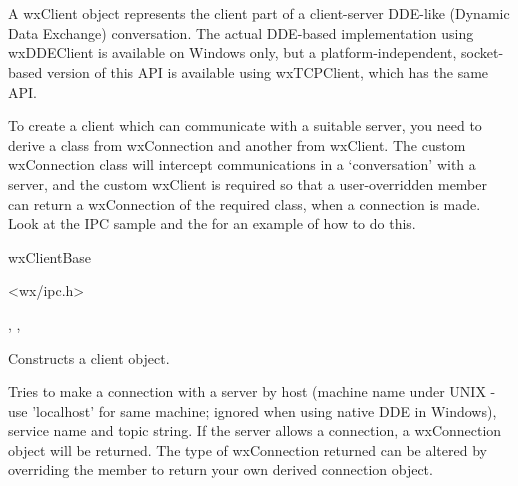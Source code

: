 \section{}\label{wxclient}

A wxClient object represents the client part of a client-server
DDE-like (Dynamic Data Exchange) conversation. The actual
DDE-based implementation using wxDDEClient is available on Windows
only, but a platform-independent, socket-based version of this
API is available using wxTCPClient, which has the same API.

To create a client which can communicate with a suitable server,
you need to derive a class from wxConnection and another from
wxClient. The custom wxConnection class will intercept
communications in a `conversation' with a server, and the custom
wxClient is required so that a user-overridden
member can return a wxConnection of the required class, when a
connection is made. Look at the IPC sample and the 
 for
an example of how to do this.


wxClientBase\\


<wx/ipc.h>


, 
, 


\label{wxclientctor}


Constructs a client object.

\label{wxclientmakeconnection}


Tries to make a connection with a server by host (machine name
under UNIX - use 'localhost' for same machine; ignored when using
native DDE in Windows), service name and topic string. If the
server allows a connection, a wxConnection object will be
returned. The type of wxConnection returned can be altered by
overriding the 
member to return your own derived connection object.

